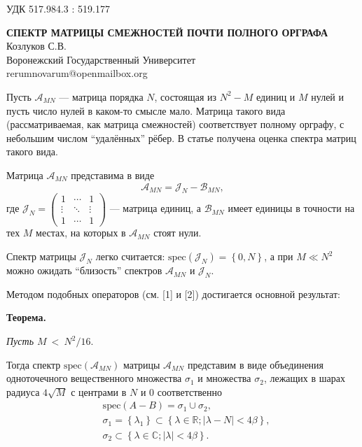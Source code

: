 \documentclass[11pt]{article}
\begin{document}
\small{УДК 517.984.3 : 519.177}

\begin{center}
\textbf{СПЕКТР МАТРИЦЫ СМЕЖНОСТЕЙ ПОЧТИ ПОЛНОГО ОРГРАФА}\\
\small{Козлуков С.В.} \\
\small{Воронежский Государственный Университет} \\
\small{rerumnovarum@openmailbox.org} \\
\end{center}

Пусть \( \mathscr{A}_{MN} \) --- матрица порядка \( N \),
состоящая из \( N^2 - M \) единиц и \( M \) нулей
и пусть число нулей в каком-то смысле мало.
Матрица такого вида (рассматриваемая, как матрица смежностей) соответствует
полному орграфу, с небольшим числом ``удалённых'' рёбер.
В статье получена оценка спектра
матриц такого вида.

Матрица \( \mathscr{A}_{MN} \) представима в виде
\[
    \mathscr{A}_{MN} = \mathscr{J}_{N} - \mathscr{B}_{MN},
    \]
где \(
\mathscr{J}_{N} =
\begin{pmatrix}1 & \cdots & 1 \\
\vdots & \ddots & \vdots \\
1 & \cdots & 1
\end{pmatrix} \) --- матрица единиц,
а \( \mathscr{B}_{MN} \) имеет единицы в точности на тех \( M \)
местах, на которых в \( \mathscr{A}_{MN} \) стоят нули.

Спектр матрицы \( \mathscr{J}_{N} \) легко считается:
\( \mathrm{spec}\left({\mathscr{J}_{N}}\right) = \left\{0, N \right\} \),
а при \( M \ll N^2 \) можно ожидать ``близость'' спектров
\( \mathscr{A}_{MN} \) и \( \mathscr{J}_{N} \).

Методом подобных операторов (см. [1] и [2])
достигается основной результат:

\textbf{Теорема.}

{\it
Пусть
\(M~<~\displaystyle{N^2/16}. \)

Тогда спектр \( \mathrm{spec}\left({\mathscr{A}_{MN}}\right) \)
матрицы \( \mathscr{A}_{MN} \)
представим в виде объединения
одноточечного вещественного множества \( \sigma_1 \)
и множества \( \sigma_2 \),
лежащих в шарах радиуса \( 4\sqrt{M} \)
с центрами в \( N \) и \( 0 \) соответственно
\begin{equation*}\begin{aligned}
    & \mathrm{spec}\left({A-B}\right) = \sigma_1 \cup \sigma_2, \\
    & \sigma_1 = \left\{ \lambda_1 \right\}
      \subset \left\{ \lambda\in\mathbb{R}; \lvert \lambda - N\rvert < 4\beta \right\}, \\
    & \sigma_2 \subset \left\{\lambda\in\mathbb{C}; \lvert\lambda\rvert <4\beta \right\}. \\
\end{aligned}\end{equation*}
}
\end{document}
